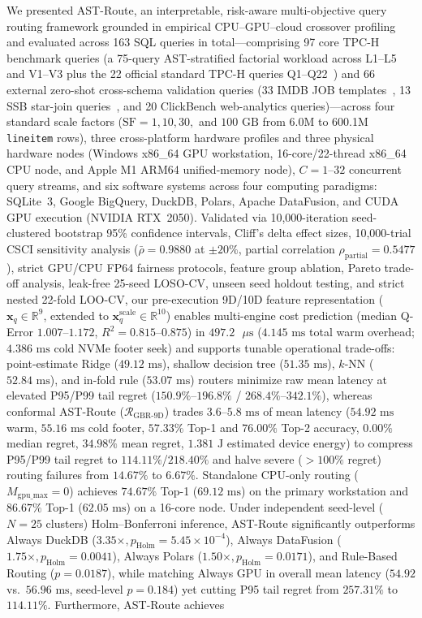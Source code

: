 \documentclass[10pt,a4paper]{article}
\begin{document}
We presented AST-Route, an interpretable, risk-aware multi-objective query routing framework grounded in empirical CPU--GPU--cloud crossover profiling and evaluated across 163 SQL queries in total---comprising 97 core TPC-H benchmark queries (a 75-query AST-stratified factorial workload across L1--L5 and V1--V3 plus the 22 official standard TPC-H queries Q1--Q22~\cite{tpc2022tpch}) and 66 external zero-shot cross-schema validation queries (33 IMDB JOB templates~\cite{leis2015job}, 13 SSB star-join queries~\cite{oneil2009ssb}, and 20 ClickBench web-analytics queries)---across four standard scale factors ($\text{SF}=1, 10, 30,$ and $100\text{ GB}$ from 6.0M to 600.1M \texttt{lineitem} rows), three cross-platform hardware profiles and three physical hardware nodes (Windows x86\_64 GPU workstation, 16-core/22-thread x86\_64 CPU node, and Apple M1 ARM64 unified-memory node), $C=1\text{--}32$ concurrent query streams, and six software systems across four computing paradigms: SQLite~3, Google BigQuery, DuckDB, Polars, Apache DataFusion, and CUDA GPU execution (NVIDIA RTX~2050). Validated via 10,000-iteration seed-clustered bootstrap 95\% confidence intervals, Cliff's delta effect sizes, 10,000-trial CSCI sensitivity analysis ($\bar{\rho}=0.9880$ at $\pm 20\%$, partial correlation $\rho_{\text{partial}}=0.5477$), strict GPU/CPU FP64 fairness protocols, feature group ablation, Pareto trade-off analysis, leak-free 25-seed LOSO-CV, unseen seed holdout testing, and strict nested 22-fold LOO-CV, our pre-execution 9D/10D feature representation ($\mathbf{x}_q\in\mathbb{R}^9$, extended to $\mathbf{x}_q^{\text{scale}}\in\mathbb{R}^{10}$) enables multi-engine cost prediction (median Q-Error $1.007\text{--}1.172$, $R^2=0.815\text{--}0.875$) in $497.2\text{ }\mu\text{s}$ ($4.145\text{ ms}$ total warm overhead; $4.386\text{ ms}$ cold NVMe footer seek) and supports tunable operational trade-offs: point-estimate Ridge ($49.12\text{ ms}$), shallow decision tree ($51.35\text{ ms}$), $k$-NN ($52.84\text{ ms}$), and in-fold rule ($53.07\text{ ms}$) routers minimize raw mean latency at elevated P95/P99 tail regret ($150.9\%\text{--}196.8\%$ / $268.4\%\text{--}342.1\%$), whereas conformal AST-Route ($\mathcal{R}_{\text{GBR-9D}}$) trades $3.6\text{--}5.8\text{ ms}$ of mean latency ($54.92\text{ ms}$ warm, $55.16\text{ ms}$ cold footer, $57.33\%$ Top-1 and $76.00\%$ Top-2 accuracy, $0.00\%$ median regret, $34.98\%$ mean regret, $1.381\text{ J}$ estimated device energy) to compress P95/P99 tail regret to $114.11\%$/$218.40\%$ and halve severe ($>100\%$ regret) routing failures from $14.67\%$ to $6.67\%$. Standalone CPU-only routing ($M_{\text{gpu\_max}}=0$) achieves $74.67\%$ Top-1 ($69.12\text{ ms}$) on the primary workstation and $86.67\%$ Top-1 ($62.05\text{ ms}$) on a 16-core node. Under independent seed-level ($N=25$ clusters) Holm--Bonferroni inference, AST-Route significantly outperforms Always DuckDB ($3.35\times, p_{\text{Holm}}=5.45\times 10^{-4}$), Always DataFusion ($1.75\times, p_{\text{Holm}}=0.0041$), Always Polars ($1.50\times, p_{\text{Holm}}=0.0171$), and Rule-Based Routing ($p=0.0187$), while matching Always GPU in overall mean latency ($54.92$ vs.\ $56.96\text{ ms}$, seed-level $p=0.184$) yet cutting P95 tail regret from $257.31\%$ to $114.11\%$. Furthermore, AST-Route achieves 
\end{document}
